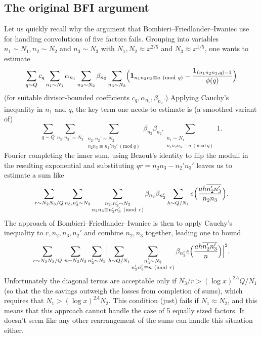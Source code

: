 \documentclass[10pt]{amsart}
\theoremstyle{plain}
\numberwithin{equation}{section}
\newcommand{\Mod}[1]{\ (\mathrm{mod}\ #1)}
\begin{document}
\subsection{The original BFI argument}
%
%
%
%
Let us quickly recall why the argument that Bombieri--Friedlander--Iwaniec use for handling convolutions of five factors fails. Grouping into variables $n_1\sim N_1,n_2\sim N_2$ and $n_3\sim N_3$ with $N_1,N_2\approx x^{2/5}$ and $N_3\approx x^{1/5}$, one wants to estimate
\begin{equation}
\sum_{q\sim Q}c_q\sum_{n_1\sim N_1}\alpha_{n_1}\sum_{n_2\sim N_2}\beta_{n_2}\sum_{n_3\sim N_3}\Bigl(\mathbf{1}_{n_1n_2n_3\equiv a\Mod{q}}-\frac{\mathbf{1}_{(n_1n_2n_3,q)=1}}{\phi(q)}\Bigr)
\label{eq:OverallTarget}
\end{equation}
(for suitable divisor-bounded coefficients $c_q,\alpha_{n_1},\beta_{n_2}$.) Applying Cauchy's inequality in $n_1$ and $q$, the key term one needs to estimate is (a smoothed variant of)
\begin{equation}
\sum_{q\sim Q}\sum_{n_3,n_3'\sim N_3}\sum_{\substack{n_2,n_2'\sim N_2\\ n_2n_3\equiv n_2'n_3'\Mod{q}}}\beta_{n_2}\beta_{n_2'}\sum_{\substack{n_1\sim N_1\\ n_1n_2n_3\equiv a\Mod{q}}}1.
\label{eq:OverallTarget2}
\end{equation}
Fourier completing the inner sum, using Bezout's identity to flip the moduli in the resulting exponential and substituting $qr=n_2n_3-n_2'n_3'$ leaves us to estimate a sum like
\begin{equation}
\sum_{r\sim N_2N_3/Q}\sum_{n_3,n_3'\sim N_3}\sum_{\substack{n_2,n_2'\sim N_2\\ n_2n_3\equiv n_2'n_3'\Mod{r}}}\beta_{n_2}\beta_{n_2'}\sum_{h\sim Q/N_1}e\Bigl(\frac{ah\overline{n_2'n_3'}}{n_2n_3}\Bigr).
\label{eq:OverallTarget3}
\end{equation}
The approach of Bombieri--Friedlander--Iwaniec is then to apply Cauchy's inequality to $r,n_2,n_3,n_2'$ and combine $n_2,n_3$ together, leading one to bound
\begin{equation}
\sum_{r\sim N_2N_3/Q}\,\sum_{n\sim N_2N_3}\sum_{n_2'\sim N_2}\Bigl|\sum_{h\sim Q/N_1}\sum_{\substack{n_3'\sim N_3\\ n_2'n_3'\equiv n\Mod{r}}}\beta_{n_2'}e\Bigl(\frac{ah\overline{n_2'n_3'}}{n}\Bigr)\Bigr|^2.
\label{eq:OverallTarget4}
\end{equation}
Unfortunately the diagonal terms are acceptable only if $N_3/r>(\log{x})^{2A}Q/N_1$ (so that the the savings outweigh the losses from completion of sums), which requires that $N_1>(\log{x})^{2A}N_2$. This condition (just) fails if $N_1\approx N_2$, and this means that this approach cannot handle the case of 5 equally sized factors. It doesn't seem like any other rearrangement of the sums can handle this situation either.
%
%
%
%
\end{document}
